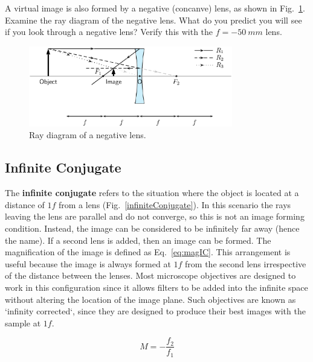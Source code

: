 \documentclass[a4paper]{report}
\begin{document}
A virtual image is also formed by a negative (concanve) lens, as shown in Fig.~\ref{fig:neglens}. 
Examine the ray diagram of the negative lens. 
What do you predict you will see if you look through a negative lens?
Verify this with the $f=-50~mm$ lens.
\begin{figure}[h]
\center
\includegraphics[width=3.5in]{negative_lens.eps}
\caption{Ray diagram of a negative lens.}
\label{fig:neglens}
\end{figure}


\clearpage

\subsection{Infinite Conjugate}
The \textbf{infinite conjugate} refers to the situation where the object is located at a distance of $1f$ from a lens (Fig.~\ref{infiniteConjugate}). 
In this scenario the rays leaving the lens are parallel and do not converge, so this is not an image forming condition. 
Instead, the image can be considered to be infinitely far away (hence the name). 
If a second lens is added, then an image can be formed. 
The magnification of the image is defined as Eq.~\ref{eq:magIC}. 
This arrangement is useful because the image is always formed at $1f$ from the second lens irrespective of the distance between the lenses.
Most microscope objectives are designed to work in this configuration since it allows filters to be added into the infinite space without altering the location of the image plane. 
Such objectives are known as `infinity corrected`, since they are designed to produce their best images with the sample at $1f$.

\begin{equation}
M=-\frac{f_2}{f_1}
\label{eq:magIC}
\end{equation}
\end{document}
